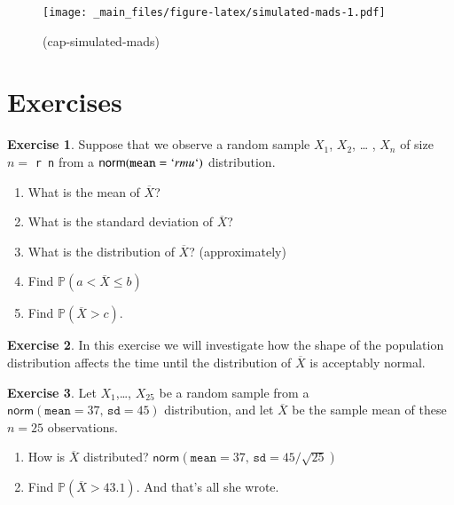 \documentclass[]{book}
\providecommand{\tightlist}{%
  \setlength{\itemsep}{0pt}\setlength{\parskip}{0pt}}
\numberwithin{equation}{chapter}
\numberwithin{figure}{chapter}
\theoremstyle{plain}
\theoremstyle{definition}
\newtheorem{xca}{Exercise}[chapter]
\theoremstyle{remark}
\theoremstyle{definition}
\theoremstyle{definition}
\theoremstyle{remark}
\let\BeginKnitrBlock\begin \let\EndKnitrBlock\end
\begin{document}
\begin{figure}[htbp]
\centering
\texttt{[image: \_main\_files/figure-latex/simulated-mads-1.pdf]}
\caption{\label{fig:simulated-mads}(cap-simulated-mads)}
\end{figure}



\section{Exercises}\label{exercises-6}

\BeginKnitrBlock{xca}
Suppose that we observe a random sample \(X_{1}\), \(X_{2}\), \ldots{} ,
\(X_{n}\) of size \(n = \) \texttt{r\ n} from a
\(\mathsf{norm}(\mathtt{mean}= `r mu`)\) distribution.

\begin{enumerate}
\def\labelenumi{\arabic{enumi}.}
\tightlist
\item
  What is the mean of \(\overline{X}\)?
\item
  What is the standard deviation of \(\overline{X}\)?
\item
  What is the distribution of \(\overline{X}\)? (approximately)
\item
  Find \(\mathbb{P}(a< \overline{X} \leq b)\)
\item
  Find \(\mathbb{P}(\overline{X} > c)\).
\end{enumerate}
\EndKnitrBlock{xca}

\bigskip

\begin{xca}
In this exercise we will investigate how the shape of the population
distribution affects the time until the distribution of \(\overline{X}\)
is acceptably normal.
\end{xca}

\bigskip

\begin{xca}
Let \(X_{1}\),\ldots{}, \(X_{25}\) be a random sample from a
\(\mathsf{norm}(\mathtt{mean}=37,\,\mathtt{sd}=45)\) distribution, and
let \(\overline{X}\) be the sample mean of these \(n=25\) observations.

\begin{enumerate}
\def\labelenumi{\arabic{enumi}.}
\tightlist
\item
  How is \(\overline{X}\) distributed?
  \(\mathsf{norm}(\mathtt{mean}=37,\,\mathtt{sd}=45/\sqrt{25})\)
\item
  Find \(\mathbb{P}(\overline{X} > 43.1)\). And that's all she wrote.
\end{enumerate}
\end{xca}
\end{document}
